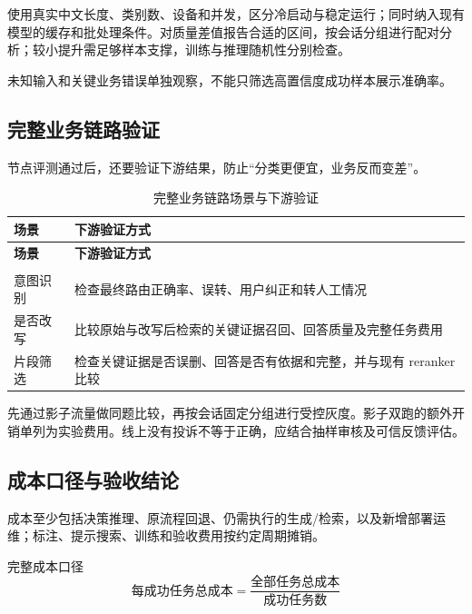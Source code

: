 \documentclass[UTF8,a4paper,11pt,fontset=windows]{ctexart}
\begin{document}
使用真实中文长度、类别数、设备和并发，区分冷启动与稳定运行；同时纳入现有模型的缓存和批处理条件。对质量差值报告合适的区间，按会话分组进行配对分析；较小提升需足够样本支撑，训练与推理随机性分别检查。


未知输入和关键业务错误单独观察，不能只筛选高置信度成功样本展示准确率。


\subsection{完整业务链路验证}

节点评测通过后，还要验证下游结果，防止“分类更便宜，业务反而变差”。


{\small\setlength{\tabcolsep}{4pt}\renewcommand{\arraystretch}{1.28}
\begin{longtable}{>{\raggedright\arraybackslash}p{0.420\dimexpr\linewidth-4\tabcolsep\relax}>{\raggedright\arraybackslash}p{0.580\dimexpr\linewidth-4\tabcolsep\relax}}
\caption{完整业务链路场景与下游验证}\label{tab:chain-validation}\\
\toprule
\textbf{场景} & \textbf{下游验证方式} \\
\midrule
\endfirsthead
\toprule
\textbf{场景} & \textbf{下游验证方式} \\
\midrule
\endhead
\midrule\multicolumn{2}{r}{\scriptsize\color{Muted}续下页}\\\endfoot
\bottomrule\endlastfoot
意图识别 & 检查最终路由正确率、误转、用户纠正和转人工情况 \\
是否改写 & 比较原始与改写后检索的关键证据召回、回答质量及完整任务费用 \\
片段筛选 & 检查关键证据是否误删、回答是否有依据和完整，并与现有 reranker 比较 \\
\end{longtable}}

先通过影子流量做同题比较，再按会话固定分组进行受控灰度。影子双跑的额外开销单列为实验费用。线上没有投诉不等于正确，应结合抽样审核及可信反馈评估。


\subsection{成本口径与验收结论}

成本至少包括决策推理、原流程回退、仍需执行的生成/检索，以及新增部署运维；标注、提示搜索、训练和验收费用按约定周期摊销。


\begin{insight}{完整成本口径}\[\text{每成功任务总成本}=\frac{\text{全部任务总成本}}{\text{成功任务数}}\]\end{insight}
\end{document}
